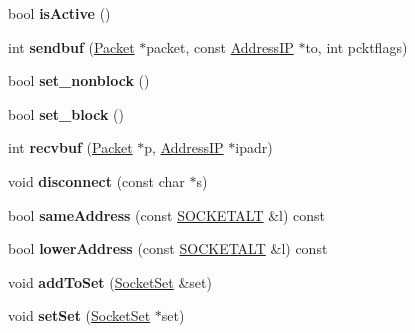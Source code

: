 \begin{DoxyCompactItemize}
\item 
bool {\bfseries is\+Active} ()\hypertarget{classSOCKETALT_a90e13486280f85c9a6d1d3eb21a8f1c3}{}\label{classSOCKETALT_a90e13486280f85c9a6d1d3eb21a8f1c3}

\item 
int {\bfseries sendbuf} (\hyperlink{classPacket}{Packet} $\ast$packet, const \hyperlink{structAddressIP}{Address\+IP} $\ast$to, int pcktflags)\hypertarget{classSOCKETALT_afc8ce31d28f5e0a7f5ac14eeb4f72431}{}\label{classSOCKETALT_afc8ce31d28f5e0a7f5ac14eeb4f72431}

\item 
bool {\bfseries set\+\_\+nonblock} ()\hypertarget{classSOCKETALT_a1b164a7f253b893f5a16792d65a098ba}{}\label{classSOCKETALT_a1b164a7f253b893f5a16792d65a098ba}

\item 
bool {\bfseries set\+\_\+block} ()\hypertarget{classSOCKETALT_a3e53d4e62e6fe210dbeaa014ee2133cd}{}\label{classSOCKETALT_a3e53d4e62e6fe210dbeaa014ee2133cd}

\item 
int {\bfseries recvbuf} (\hyperlink{classPacket}{Packet} $\ast$p, \hyperlink{structAddressIP}{Address\+IP} $\ast$ipadr)\hypertarget{classSOCKETALT_ad9aed444072280a467432597aae9af7c}{}\label{classSOCKETALT_ad9aed444072280a467432597aae9af7c}

\item 
void {\bfseries disconnect} (const char $\ast$s)\hypertarget{classSOCKETALT_a29b35c54a1a76ab77892f2ed7ed0b442}{}\label{classSOCKETALT_a29b35c54a1a76ab77892f2ed7ed0b442}

\item 
bool {\bfseries same\+Address} (const \hyperlink{classSOCKETALT}{S\+O\+C\+K\+E\+T\+A\+LT} \&l) const \hypertarget{classSOCKETALT_a77f4bec3ac14b1518b90651e27748b61}{}\label{classSOCKETALT_a77f4bec3ac14b1518b90651e27748b61}

\item 
bool {\bfseries lower\+Address} (const \hyperlink{classSOCKETALT}{S\+O\+C\+K\+E\+T\+A\+LT} \&l) const \hypertarget{classSOCKETALT_aea16708352723a0d61fcd3c1a422597e}{}\label{classSOCKETALT_aea16708352723a0d61fcd3c1a422597e}

\item 
void {\bfseries add\+To\+Set} (\hyperlink{classSocketSet}{Socket\+Set} \&set)\hypertarget{classSOCKETALT_afcb332c1cfe2307a2a28b606b9c9e1a7}{}\label{classSOCKETALT_afcb332c1cfe2307a2a28b606b9c9e1a7}

\item 
void {\bfseries set\+Set} (\hyperlink{classSocketSet}{Socket\+Set} $\ast$set)\hypertarget{classSOCKETALT_ae1f78ebf1a9def92d697394614b82890}{}\label{classSOCKETALT_ae1f78ebf1a9def92d697394614b82890}


\end{DoxyCompactItemize}
